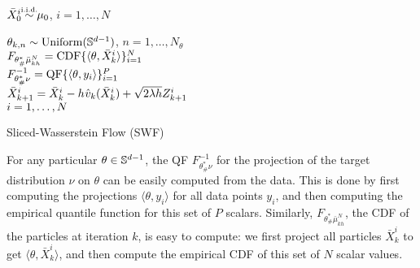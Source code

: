      \begin{algorithm2e} %
		 \SetInd{0.1ex}{1.5ex}
		 \DontPrintSemicolon
		 {\color{purple} \small {}}
		 $\bar{X}_0^i \simiid \mu_0$, \hfill $i = 1,\dots,N$ \\
     {
		    {\color{purple} \small {}}
		    $\theta_{k,n} \sim \mathrm{Uniform}(\mathbb{S}^{d-1})$, \hfill $n = 1,\dots,N_\theta$\\
        {
        {\color{purple} \small {}}
        $F_{\theta^*_\#\bar{\mu}_{kh}^{N}}=\textnormal{CDF}\{\langle\theta,\bar{X}_k^i \rangle\}_{i=1}^N$\\
        {\color{purple} \small {}}
        $F^{-1}_{\theta^*_\#\nu}=\textnormal{QF}\{\langle\theta,y_i \rangle\}_{i=1}^P$\\
        }
        {\color{purple} \small {}}
        $\bar{X}_{k+1}^i = \bar{X}_{k}^i - h \hspace{0.5pt} \hat{v}_k(\bar{X}^i_k) + \sqrt{2 \lambda h} Z^i_{k+1}$ \vspace{2pt} \\
        $\hfill i = 1,\dots,N$

		 }
		 \caption{Sliced-Wasserstein Flow (SWF)}
		 \label{algo:flow}
	 \end{algorithm2e}

For any particular $\theta\in\mathbb{S}^{d-1}$, the QF $F_{\theta^*_\#\nu}^{-1}$ for the projection of the target distribution $\nu$ on $\theta$ can be easily computed from the data. This is done by first computing the projections $\langle \theta, y_i\rangle$ for all data points $y_i$, and then computing the empirical quantile function for this set of $P$ scalars.
%
Similarly, $F_{\theta^*_\#\bar{\mu}_{kh}^{N}}$, the CDF of the particles at iteration $k$, is easy to compute: we first project all particles $\bar{X}_k^i$ to get $\langle \theta, \bar{X}_k^i\rangle$, and then compute the empirical CDF of this set of $N$ scalar values.


